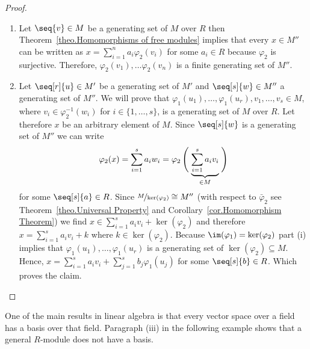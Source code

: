 \begin{proof}
\begin{enumerate}
\item Let $\seq{v}\in M$ be a generating set of $M$ over $R$ then Theorem~\ref{theo.Homomorphisms of free modules} implies that every $x\in M''$ can be written as $x=\sum_{i=1}^n a_i\varphi_2(v_i)$ for some $a_i\in R$ because $\varphi_2$ is surjective. Therefore, $\varphi_2(v_1),\ldots\varphi_2(v_n)$ is a finite generating set of $M''$.
\item Let $\seq[r]{u}\in M'$ be a generating set of $M'$ and $\seq[s]{w}\in M''$ a generating set of $M''$. We will prove that $\varphi_1(u_1),\ldots,\varphi_1(u_r),v_1,\ldots,v_s\in M$, where $v_i\in\varphi_2^{-1}(w_i)$ for $i\in\lbrace 1,\ldots,s\rbrace$, is a generating set of $M$ over $R$. Let therefore $x$ be an arbitrary element of $M$. Since $\seq[s]{w}$ is a generating set of $M''$ we can write 
\begin{equation*}
\varphi_2(x)=\sum_{i=1}^s a_i w_i=\varphi_2\left(\vphantom{\sum_{i=1}^s}\right.
\underbrace{\sum_{i=1}^s a_i v_i}_{\in M}
\left. \vphantom{\sum_{i=1}^s}\right)
\end{equation*}
for some $\seq[s]{a}\in R$. Since $\nicefrac{M}{\ker(\varphi_2)}\cong M''$ (with respect to $\bar{\varphi}_2$ see Theorem~\ref{theo.Universal Property} and Corollary~\ref{cor.Homomorphism Theorem}) we find $x\in \sum_{i=1}^s a_i v_i+\ker(\varphi_2)$ and therefore $x=\sum_{i=1}^s a_i v_i+k$ where $k\in\ker(\varphi_2)$. Because $\im(\varphi_1)=\ker(\varphi_2)$ part (i) implies that $\varphi_1(u_1),\ldots,\varphi_1(u_r)$ is a generating set of $\ker(\varphi_2)\subseteq M$. Hence, $x=\sum_{i=1}^s a_i v_i+\sum_{j=1}^s b_j \varphi_1(u_j)$ for some $\seq[s]{b}\in R$. Which proves the claim.
\end{enumerate}
\end{proof}

One of the main results in linear algebra is that every vector space over a field has a basis over that field. Paragraph (iii) in the following example shows that a general $R$-module does not have a basis.

